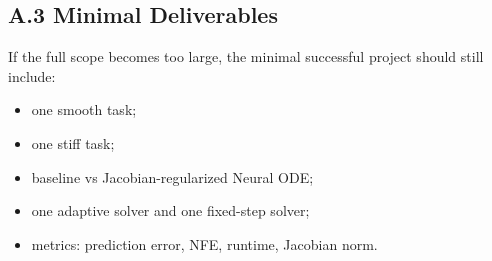 \documentclass[11pt]{article}
\begin{document}
\subsection*{A.3 Minimal Deliverables}
If the full scope becomes too large, the minimal successful project should still include:
\begin{itemize}[leftmargin=2em]
    \item one smooth task;
    \item one stiff task;
    \item baseline vs Jacobian-regularized Neural ODE;
    \item one adaptive solver and one fixed-step solver;
    \item metrics: prediction error, NFE, runtime, Jacobian norm.
\end{itemize}



\end{document}
